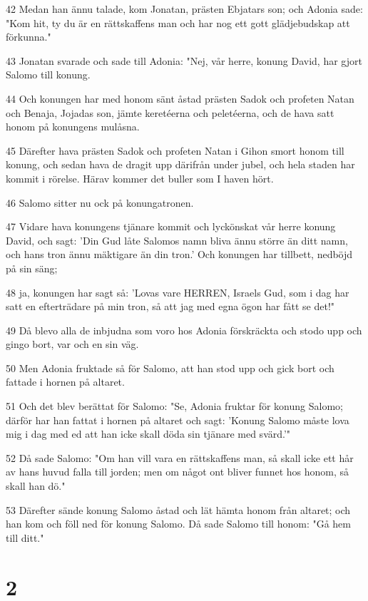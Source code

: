 \par 42 Medan han ännu talade, kom Jonatan, prästen Ebjatars son; och Adonia sade: "Kom hit, ty du är en rättskaffens man och har nog ett gott glädjebudskap att förkunna."
\par 43 Jonatan svarade och sade till Adonia: "Nej, vår herre, konung David, har gjort Salomo till konung.
\par 44 Och konungen har med honom sänt åstad prästen Sadok och profeten Natan och Benaja, Jojadas son, jämte keretéerna och peletéerna, och de hava satt honom på konungens mulåsna.
\par 45 Därefter hava prästen Sadok och profeten Natan i Gihon smort honom till konung, och sedan hava de dragit upp därifrån under jubel, och hela staden har kommit i rörelse. Härav kommer det buller som I haven hört.
\par 46 Salomo sitter nu ock på konungatronen.
\par 47 Vidare hava konungens tjänare kommit och lyckönskat vår herre konung David, och sagt: 'Din Gud låte Salomos namn bliva ännu större än ditt namn, och hans tron ännu mäktigare än din tron.' Och konungen har tillbett, nedböjd på sin säng;
\par 48 ja, konungen har sagt så: 'Lovas vare HERREN, Israels Gud, som i dag har satt en efterträdare på min tron, så att jag med egna ögon har fått se det!"
\par 49 Då blevo alla de inbjudna som voro hos Adonia förskräckta och stodo upp och gingo bort, var och en sin väg.
\par 50 Men Adonia fruktade så för Salomo, att han stod upp och gick bort och fattade i hornen på altaret.
\par 51 Och det blev berättat för Salomo: "Se, Adonia fruktar för konung Salomo; därför har han fattat i hornen på altaret och sagt: 'Konung Salomo måste lova mig i dag med ed att han icke skall döda sin tjänare med svärd.'"
\par 52 Då sade Salomo: "Om han vill vara en rättskaffens man, så skall icke ett hår av hans huvud falla till jorden; men om något ont bliver funnet hos honom, så skall han dö."
\par 53 Därefter sände konung Salomo åstad och lät hämta honom från altaret; och han kom och föll ned för konung Salomo. Då sade Salomo till honom: "Gå hem till ditt."

\chapter{2}

